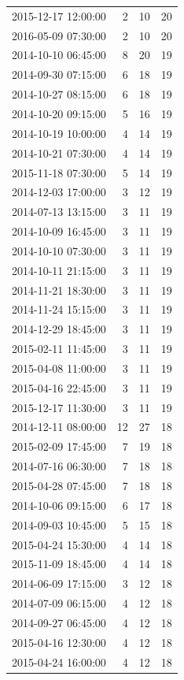 \begin{tabular}{lrrr}
2015-12-17 12:00:00 & 2 & 10 & 20 \\
2016-05-09 07:30:00 & 2 & 10 & 20 \\
2014-10-10 06:45:00 & 8 & 20 & 19 \\
2014-09-30 07:15:00 & 6 & 18 & 19 \\
2014-10-27 08:15:00 & 6 & 18 & 19 \\
2014-10-20 09:15:00 & 5 & 16 & 19 \\
2014-10-19 10:00:00 & 4 & 14 & 19 \\
2014-10-21 07:30:00 & 4 & 14 & 19 \\
2015-11-18 07:30:00 & 5 & 14 & 19 \\
2014-12-03 17:00:00 & 3 & 12 & 19 \\
2014-07-13 13:15:00 & 3 & 11 & 19 \\
2014-10-09 16:45:00 & 3 & 11 & 19 \\
2014-10-10 07:30:00 & 3 & 11 & 19 \\
2014-10-11 21:15:00 & 3 & 11 & 19 \\
2014-11-21 18:30:00 & 3 & 11 & 19 \\
2014-11-24 15:15:00 & 3 & 11 & 19 \\
2014-12-29 18:45:00 & 3 & 11 & 19 \\
2015-02-11 11:45:00 & 3 & 11 & 19 \\
2015-04-08 11:00:00 & 3 & 11 & 19 \\
2015-04-16 22:45:00 & 3 & 11 & 19 \\
2015-12-17 11:30:00 & 3 & 11 & 19 \\
2014-12-11 08:00:00 & 12 & 27 & 18 \\
2015-02-09 17:45:00 & 7 & 19 & 18 \\
2014-07-16 06:30:00 & 7 & 18 & 18 \\
2015-04-28 07:45:00 & 7 & 18 & 18 \\
2014-10-06 09:15:00 & 6 & 17 & 18 \\
2014-09-03 10:45:00 & 5 & 15 & 18 \\
2015-04-24 15:30:00 & 4 & 14 & 18 \\
2015-11-09 18:45:00 & 4 & 14 & 18 \\
2014-06-09 17:15:00 & 3 & 12 & 18 \\
2014-07-09 06:15:00 & 4 & 12 & 18 \\
2014-09-27 06:45:00 & 4 & 12 & 18 \\
2015-04-16 12:30:00 & 4 & 12 & 18 \\
2015-04-24 16:00:00 & 4 & 12 & 18 \\

\end{tabular}
